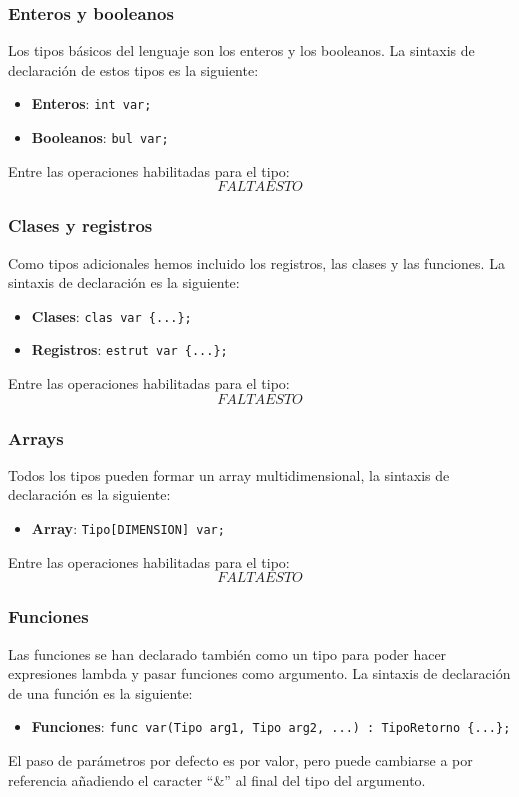 \documentclass[10pt,a4paper]{article}
\begin{document}
\subsubsection{Enteros y booleanos}
Los tipos básicos del lenguaje son los enteros y los booleanos. La sintaxis de declaración de estos tipos es la siguiente:
\begin{itemize}
    \item \textbf{Enteros}: \texttt{int var;}
    \item \textbf{Booleanos}: \texttt{bul var;}
\end{itemize}
Entre las operaciones habilitadas para el tipo:
$$FALTA ESTO$$

\subsubsection{Clases y registros}
Como tipos adicionales hemos incluido los registros, las clases y las funciones. La sintaxis de declaración es la siguiente:
\begin{itemize}
    \item \textbf{Clases}: \texttt{clas var \{...\};}
    \item \textbf{Registros}: \texttt{estrut var \{...\};}
\end{itemize}
Entre las operaciones habilitadas para el tipo:
$$FALTA ESTO$$

\subsubsection{Arrays}
Todos los tipos pueden formar un array multidimensional, la sintaxis de declaración es la siguiente:
\begin{itemize}
    \item \textbf{Array}: \texttt{Tipo[DIMENSION] var;}
\end{itemize}
Entre las operaciones habilitadas para el tipo:
$$FALTA ESTO$$

\subsubsection{Funciones}
Las funciones se han declarado también como un tipo para poder hacer expresiones lambda y pasar funciones como argumento. La sintaxis de declaración de una función es la siguiente:
\begin{itemize}
    \item \textbf{Funciones}: \texttt{func var(Tipo arg1, Tipo arg2, ...) : TipoRetorno \{...\};}
\end{itemize}
El paso de parámetros por defecto es por valor, pero puede cambiarse a por referencia añadiendo el caracter ``\&'' al final del tipo del argumento.
\end{document}
